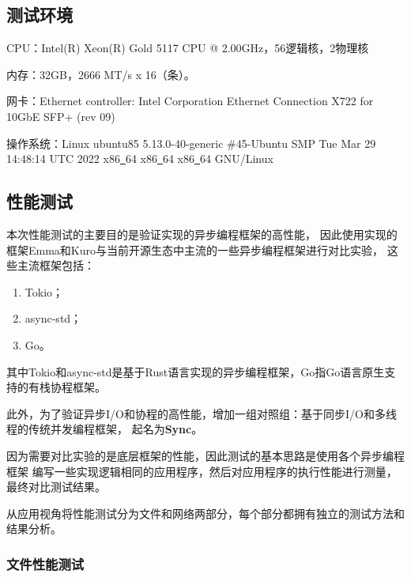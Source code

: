 \documentclass[supercite]{HustGraduPaper}
\theoremstyle{definition}
\begin{document}
\subsection{测试环境}
CPU：Intel(R) Xeon(R) Gold 5117 CPU @ 2.00GHz，56逻辑核，2物理核\par

内存：32GB，2666 MT/s x 16（条）。\par

网卡：Ethernet controller: Intel Corporation Ethernet Connection X722 for 10GbE SFP+ (rev 09)\par

操作系统：Linux ubuntu85 5.13.0-40-generic \#45-Ubuntu SMP Tue Mar 29 14:48:14 UTC 2022 x86\underline{~}64 x86\underline{~}64 x86\underline{~}64 GNU/Linux\par

\subsection{性能测试}

本次性能测试的主要目的是验证实现的异步编程框架的高性能，
因此使用实现的框架Emma和Kuro与当前开源生态中主流的一些异步编程框架进行对比实验，
这些主流框架包括：

\begin{enumerate}[label={(\arabic*)}]
  \item Tokio；
  \item async-std；
  \item Go。
\end{enumerate}

其中Tokio和async-std是基于Rust语言实现的异步编程框架，Go指Go语言原生支持的有栈协程框架。\par

此外，为了验证异步I/O和协程的高性能，增加一组对照组：基于同步I/O和多线程的传统并发编程框架，
起名为\textbf{Sync}。\par

因为需要对比实验的是底层框架的性能，因此测试的基本思路是使用各个异步编程框架
编写一些实现逻辑相同的应用程序，然后对应用程序的执行性能进行测量，最终对比测试结果。\par

从应用视角将性能测试分为文件和网络两部分，每个部分都拥有独立的测试方法和结果分析。\par

\subsubsection{文件性能测试}
\end{document}
